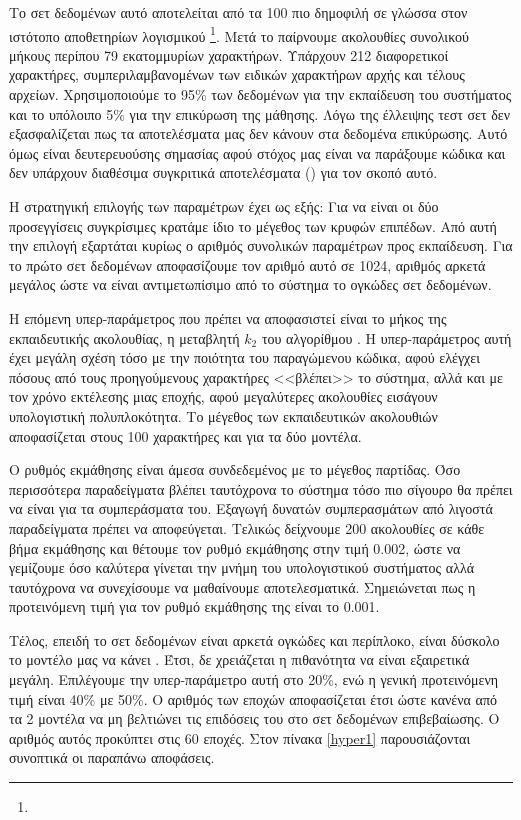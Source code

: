 Το σετ δεδομένων αυτό αποτελείται από τα 100 πιο δημοφιλή  σε γλώσσα  στον ιστότοπο αποθετηρίων λογισμικού \footnote{}.
Μετά το  παίρνουμε ακολουθίες συνολικού μήκους περίπου 79 εκατομμυρίων χαρακτήρων.
Υπάρχουν 212 διαφορετικοί χαρακτήρες, συμπεριλαμβανομένων των ειδικών χαρακτήρων αρχής και τέλους αρχείων.
Χρησιμοποιούμε το 95\% των δεδομένων για την εκπαίδευση του συστήματος και το υπόλοιπο 5\% για την επικύρωση της μάθησης.
Λόγω της έλλειψης τεστ σετ δεν εξασφαλίζεται πως τα αποτελέσματα μας δεν κάνουν  στα δεδομένα επικύρωσης. Αυτό όμως είναι δευτερευούσης σημασίας αφού στόχος μας είναι να παράξουμε κώδικα και δεν υπάρχουν διαθέσιμα συγκριτικά αποτελέσματα () για τον σκοπό αυτό.

Η στρατηγική επιλογής των παραμέτρων έχει ως εξής: Για να είναι οι δύο προσεγγίσεις συγκρίσιμες κρατάμε ίδιο το μέγεθος των κρυφών επιπέδων.
Από αυτή την επιλογή εξαρτάται κυρίως ο αριθμός συνολικών παραμέτρων προς εκπαίδευση.
Για το πρώτο σετ δεδομένων αποφασίζουμε τον αριθμό αυτό σε 1024, αριθμός αρκετά μεγάλος ώστε να είναι αντιμετωπίσιμο από το σύστημα το ογκώδες σετ δεδομένων.

Η επόμενη υπερ-παράμετρος που πρέπει να αποφασιστεί είναι το μήκος της εκπαιδευτικής ακολουθίας, η μεταβλητή $k_2$ του αλγορίθμου .
Η υπερ-παράμετρος αυτή έχει μεγάλη σχέση τόσο με την ποιότητα του παραγώμενου κώδικα, αφού ελέγχει πόσους από τους προηγούμενους χαρακτήρες <<βλέπει>> το σύστημα, αλλά και με τον χρόνο εκτέλεσης μιας εποχής, αφού μεγαλύτερες ακολουθίες εισάγουν υπολογιστική πολυπλοκότητα.
Το μέγεθος των εκπαιδευτικών ακολουθιών αποφασίζεται στους 100 χαρακτήρες και για τα δύο μοντέλα.

Ο ρυθμός εκμάθησης είναι άμεσα συνδεδεμένος με το μέγεθος παρτίδας.
Όσο περισσότερα παραδείγματα βλέπει ταυτόχρονα το σύστημα τόσο πιο σίγουρο θα πρέπει να είναι για τα συμπεράσματα του.
Εξαγωγή δυνατών συμπερασμάτων από λιγοστά παραδείγματα πρέπει να αποφεύγεται.
Τελικώς δείχνουμε 200 ακολουθίες σε κάθε βήμα εκμάθησης και θέτουμε τον ρυθμό εκμάθησης στην τιμή 0.002, ώστε να γεμίζουμε όσο καλύτερα γίνεται την μνήμη του υπολογιστικού συστήματος αλλά ταυτόχρονα να συνεχίσουμε να μαθαίνουμε αποτελεσματικά.
Σημειώνεται πως η προτεινόμενη τιμή για τον ρυθμό εκμάθησης της  είναι το 0.001.

Τέλος, επειδή το σετ δεδομένων  είναι αρκετά ογκώδες και περίπλοκο, είναι δύσκολο το μοντέλο μας να κάνει . Έτσι, δε χρειάζεται η πιθανότητα  να είναι εξαιρετικά μεγάλη.
Επιλέγουμε την υπερ-παράμετρο αυτή στο 20\%, ενώ η γενική προτεινόμενη τιμή είναι 40\% με 50\%.
Ο αριθμός των εποχών αποφασίζεται έτσι ώστε κανένα από τα 2 μοντέλα να μη βελτιώνει τις επιδόσεις του στο σετ δεδομένων επιβεβαίωσης.
Ο αριθμός αυτός προκύπτει στις 60 εποχές.
Στον πίνακα \ref{hyper1} παρουσιάζονται συνοπτικά οι παραπάνω αποφάσεις.

